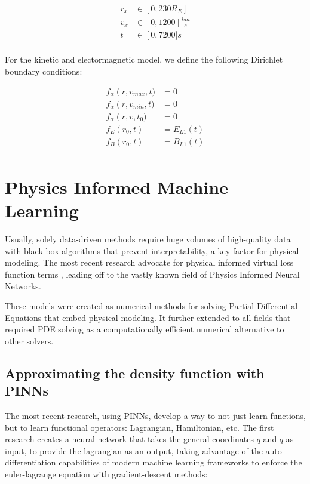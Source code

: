 \documentclass[12pt]{article}
\begin{document}
\begin{align*}
    r_x &\in \left[0, 230R_E\right] \\
    v_x &\in \left[0, 1200\right]\frac{km}{s} \\
    t &\in \left[0, 7200]s \\
\end{align*}

For the kinetic and electormagnetic model, we define the following Dirichlet boundary conditions:

\begin{align*}
    f_\alpha\left(r, v_{max}, t) &= 0 \\
    f_\alpha\left(r, v_{min}, t) &= 0 \\
    f_\alpha\left(r, v, t_0) &= 0 \\
    f_E\left(r_0, t\right) &= E_{L1}(t) \\
    f_B\left(r_0, t\right) &= B_{L1}(t) \\
\end{align*}

\section{Physics Informed Machine Learning}
Usually, solely data-driven methods require huge volumes of high-quality data with black box algorithms that prevent interpretability, a key factor for physical modeling. The most recent research advocate for physical informed virtual loss function terms \cite{}, leading off to the vastly known field of Physics Informed Neural Networks.

These models were created as numerical methods for solving Partial Differential Equations that embed physical modeling. It further extended to all fields that required PDE solving as a computationally efficient numerical alternative to other solvers.

\subsection{Approximating the density function with PINNs}
The most recent research, using PINNs, develop a way to not just learn functions, but to learn functional operators: Lagrangian, Hamiltonian, etc. \cite{cranmer2020lagrangianneuralnetworks, greydanus2019hamiltonianneuralnetworks} The first research creates a neural network that takes the general coordinates $q$ and $\dot q$ as input, to provide the lagrangian as an output, taking advantage of the auto-differentiation capabilities of modern machine learning frameworks to enforce the euler-lagrange equation with gradient-descent methods:
\end{document}
